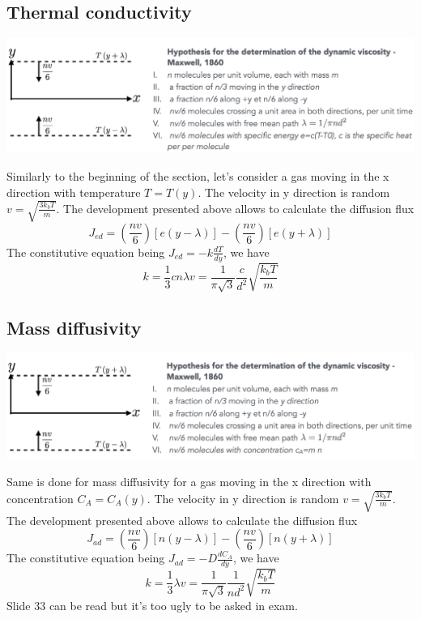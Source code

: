 \subsection{Thermal conductivity}
\begin{center}
	\includegraphics[scale=0.45]{ch1/17}
\end{center}
Similarly to the beginning of the section, let's consider a gas moving in the x direction with temperature $T=T(y)$. The velocity in y direction is random $v = \sqrt{\frac{3k_bT}{m}}$. The development presented above allows to calculate the diffusion flux 
\begin{equation}
	J_{ed} = \left(\frac{nv}{6} \right) [e(y-\lambda)] - \left(\frac{nv}{6} \right) [e(y+\lambda)]
\end{equation}
The constitutive equation being $J_{ed} = -k\frac{dT}{dy}$, we have
\begin{equation}
	k = \frac{1}{3} cn\lambda v = \frac{1}{\pi \sqrt{3}}\frac{c}{d^2}\sqrt{\frac{k_bT}{m}}
\end{equation}

\subsection{Mass diffusivity}
\begin{center}
	\includegraphics[scale=0.45]{ch1/18}
\end{center}
Same is done for mass diffusivity for a gas moving in the x direction with concentration  $C_A=C_A(y)$. The velocity in y direction is random $v = \sqrt{\frac{3k_bT}{m}}$. The development presented above allows to calculate the diffusion flux 
\begin{equation}
	J_{ad} = \left(\frac{nv}{6} \right) [n(y-\lambda)] - \left(\frac{nv}{6} \right) [n(y+\lambda)]
\end{equation}
The constitutive equation being $J_{ad} = -D\frac{dC_A}{dy}$, we have
\begin{equation}
	k = \frac{1}{3} \lambda v = \frac{1}{\pi \sqrt{3}}\frac{1}{nd^2}\sqrt{\frac{k_bT}{m}}
\end{equation}
Slide 33 can be read but it's too ugly to be asked in exam.


